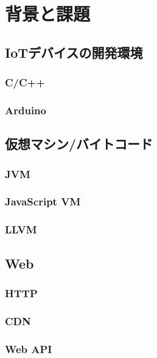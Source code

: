 \chapter{背景と課題}
\label{chap:background}

\section{IoTデバイスの開発環境}

\subsection{C/C++}

\subsection{Arduino}

\section{仮想マシン/バイトコード}

\subsection{JVM}

\subsection{JavaScript VM}

\subsection{LLVM}

\section{Web}

\subsection{HTTP}

\subsection{CDN}

\subsection{Web API}

